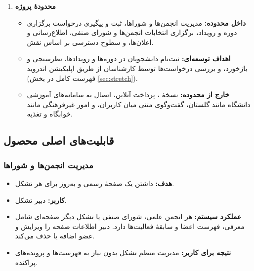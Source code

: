 \documentclass[a4paper,12pt]{article}
\newcommand{\engb}[1]{\textcolor{engblue}{\lr{#1}}}
\newcommand{\q}[1]{\textcolor{brand}{\textbf{#1}}\par}
\begin{document}
\begin{enumerate}
        \vspace*{0.5cm}
	\item \q{محدودهٔ پروژه}
	\begin{itemize}
		\item \textbf{داخل محدوده:} مدیریت انجمن‌ها و شوراها، ثبت و پیگیری درخواست برگزاری دوره و رویداد، برگزاری انتخابات انجمن‌ها و شورای صنفی، اطلاع‌رسانی و اعلان‌ها، و سطوح دسترسی بر اساس نقش.
		\item \textbf{اهداف توسعه‌ای:} ثبت‌نام دانشجویان در دوره‌ها و رویدادها، نظرسنجی و بازخورد، و بررسی درخواست‌ها توسط کارشناسان از طریق اپلیکیشن اندروید (فهرست کامل در بخش \ref{sec:stretch}).
		\item \textbf{خارج از محدوده:} نسخهٔ \engb{iOS}، پرداخت آنلاین، اتصال به سامانه‌های آموزشی دانشگاه مانند گلستان، گفت‌وگوی متنی میان کاربران، و امور غیرفرهنگی مانند خوابگاه و تغذیه.
	\end{itemize}
\end{enumerate}

\vspace*{1cm}
\subsection{قابلیت‌های اصلی محصول}\label{sec:core}

\vspace*{0.5cm}
\subsubsection{مدیریت انجمن‌ها و شوراها}
\begin{itemize}
	\item \textbf{هدف:} داشتن یک صفحهٔ رسمی و به‌روز برای هر تشکل.
	\item \textbf{کاربر:} دبیر تشکل.
	\item \textbf{عملکرد سیستم:} هر انجمن علمی، شورای صنفی یا تشکل دیگر صفحه‌ای شامل معرفی، فهرست اعضا و سابقهٔ فعالیت‌ها دارد. دبیر اطلاعات صفحه را ویرایش و عضو اضافه یا حذف می‌کند.
	\item \textbf{نتیجه برای کاربر:} مدیریت منظم تشکل بدون نیاز به فهرست‌ها و پرونده‌های پراکنده.
\end{itemize}

\vspace*{0.5cm}
\end{document}
